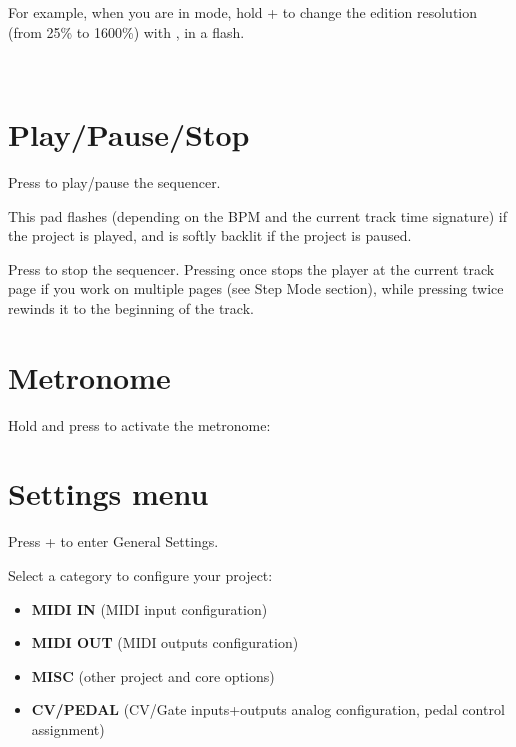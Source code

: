 For example, when you are in  mode, hold  +  to change the edition resolution (from 25\% to 1600\%) with \encodericon{}, in a flash.

\\

\section{Play/Pause/Stop}

Press \playicon{} to play/pause the sequencer.

This pad flashes (depending on the BPM and the current track time signature) if the project is played, and is softly backlit if the project is paused.

Press \stopicon{} to stop the sequencer. Pressing once stops the player at the current track page if you work on multiple pages (see Step Mode section), while pressing twice rewinds it to the beginning of the track.




\section{Metronome}

Hold  and press  to activate the metronome:




\section{Settings menu}

Press  +  to enter General Settings.


Select a category to configure your project:

\begin{itemize}
\item \textbf{MIDI IN} (MIDI input configuration)
\item \textbf{MIDI OUT} (MIDI outputs configuration)
\item \textbf{MISC} (other project and core options)
\item \textbf{CV/PEDAL} (CV/Gate inputs+outputs analog configuration, pedal control assignment)
\end{itemize}

